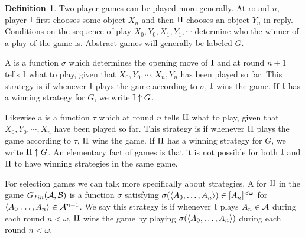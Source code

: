 \documentclass{amsart}
\theoremstyle{plain}
\theoremstyle{definition}
\newtheorem{definition}[theorem]{Definition}
\theoremstyle{remark}
\theoremstyle{plain}
\theoremstyle{definition}
\theoremstyle{remark}
\begin{document}
\begin{definition}
 Two player games can be played more generally.
 At round \(n\), player \(\mathrm{I}\) first chooses some object \(X_n\) and then \(\mathrm{II}\) chooses an object \(Y_n\) in reply.
 Conditions on the sequence of play \(X_0,Y_0,X_1,Y_1,\cdots\) determine who the winner of a play of the game is.
 Abstract games will generally be labeled \(G\).
 
 A  is a function \(\sigma\) which determines the opening move of \(\mathrm{I}\) and at round \(n+1\) tells \(\mathrm{I}\) what to play, given that \(X_0,Y_0,\cdots,X_n,Y_n\) has been played so far.
 This strategy is  if whenever \(\mathrm{I}\) plays the game according to \(\sigma\), \(\mathrm{I}\) wins the game.
 If \(\mathrm{I}\) has a winning strategy for \(G\), we write \(\mathrm{I}\uparrow G\).
 
 Likewise a  is a function \(\tau\) which at round \(n\) tells \(\mathrm{II}\) what to play, given that \(X_0,Y_0,\cdots,X_n\) have been played so far.
 This strategy is  if whenever \(\mathrm{II}\) plays the game according to \(\tau\), \(\mathrm{II}\) wins the game.
 If \(\mathrm{II}\) has a winning strategy for \(G\), we write \(\mathrm{II}\uparrow G\).
 An elementary fact of games is that it is not possible for both \(\mathrm{I}\) and \(\mathrm{II}\) to have winning strategies in the same game.

 For selection games we can talk more specifically about strategies.
  A  for \(\mathrm{II}\) in the game \(G_{fin}(\mathcal{A},\mathcal{B})\) is a function \(\sigma\) satisfying \(\sigma(\langle A_0,\dots,A_n\rangle)\in[A_n]^{<\omega}\) for \(\langle A_0\,\dots,A_n\rangle\in\mathcal{A}^{n+1}\).
  We say this strategy is  if whenever \(\mathrm{I}\) plays \(A_n\in\mathcal{A}\) during each round \(n<\omega\), \(\mathrm{II}\) wins the game by playing \(\sigma(\langle A_0,\dots,A_n\rangle)\) during each round \(n<\omega\).
\end{definition}
\end{document}

